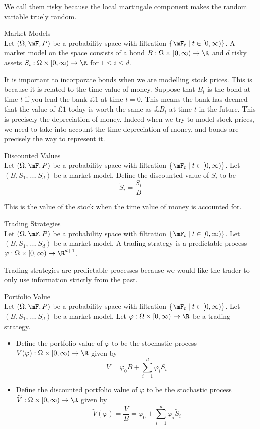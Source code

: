 \documentclass[a4paper]{article}
\begin{document}
We call them risky because the local martingale component makes the random variable truely random. 

\begin{defn}{Market Models}{}\\
Let $(\Omega,\mF,P)$ be a probability space with filtration $\{\mF_t\;|\;t\in[0,\infty)\}$. A market model on the space consists of a bond $B:\Omega\times[0,\infty)\to\R$ and $d$ risky assets $S_i:\Omega\times[0,\infty)\to\R$ for $1\leq i\leq d$. 
\end{defn}

It is important to incorporate bonds when we are modelling stock prices. This is because it is related to the time value of money. Suppose that $B_t$ is the bond at time $t$ if you lend the bank $£1$ at time $t=0$. This means the bank has deemed that the value of $£1$ today is worth the same as $£B_t$ at time $t$ in the future. This is precisely the depreciation of money. Indeed when we try to model stock prices, we need to take into account the time depreciation of money, and bonds are precisely the way to represent it. 

\begin{defn}{Discounted Values}{}\\
Let $(\Omega,\mF,P)$ be a probability space with filtration $\{\mF_t\;|\;t\in[0,\infty)\}$. Let $(B,S_1,\dots,S_d)$ be a market model. Define the discounted value of $S_i$ to be $$\widetilde{S}_i=\frac{S_i}{B}$$
\end{defn}

This is the value of the stock when the time value of money is accounted for. 

\begin{defn}{Trading Strategies}{}\\
Let $(\Omega,\mF,P)$ be a probability space with filtration $\{\mF_t\;|\;t\in[0,\infty)\}$. Let $(B,S_1,\dots,S_d)$ be a market model. A trading strategy is a predictable process $\varphi:\Omega\times[0,\infty)\to\R^{d+1}$. 
\end{defn}

Trading strategies are predictable processes because we would like the trader to only use information strictly from the past. 

\begin{defn}{Portfolio Value}{}\\
Let $(\Omega,\mF,P)$ be a probability space with filtration $\{\mF_t\;|\;t\in[0,\infty)\}$. Let $(B,S_1,\dots,S_d)$ be a market model. Let $\varphi:\Omega\times[0,\infty)\to\R$ be a trading strategy. 
\begin{itemize}
\item Define the portfolio value of $\varphi$ to be the stochastic process $V(\varphi):\Omega\times[0,\infty)\to\R$ given by $$V=\varphi_0B+\sum_{i=1}^d\varphi_iS_i$$
\item Define the discounted portfolio value of $\varphi$ to be the stochastic process $\widetilde{V}:\Omega\times[0,\infty)\to\R$ given by $$\widetilde{V}(\varphi)=\frac{V}{B}=\varphi_0+\sum_{i=1}^d\varphi_i\widetilde{S}_i$$
\end{itemize}
\end{defn}
\end{document}
